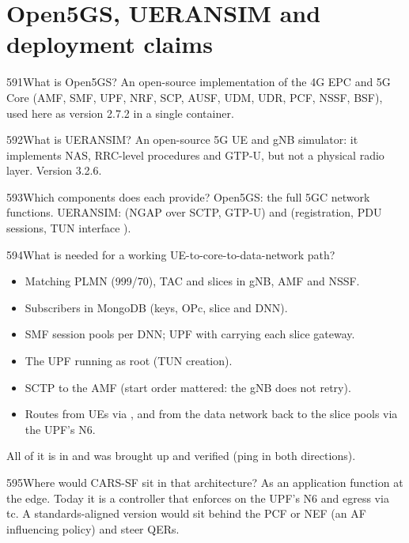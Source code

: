 \section{Open5GS, UERANSIM and deployment claims}

\begin{qa}{591}{What is Open5GS?}
An open-source implementation of the 4G EPC and 5G Core (AMF, SMF, UPF, NRF, SCP, AUSF, UDM, UDR, PCF, NSSF, BSF),
used here as version 2.7.2 in a single container.
\end{qa}

\begin{qa}{592}{What is UERANSIM?}
An open-source 5G UE and gNB simulator: it implements NAS, RRC-level procedures and GTP-U, but not a physical radio
layer. Version 3.2.6.
\end{qa}

\begin{qa}{593}{Which components does each provide?}
Open5GS: the full 5GC network functions. UERANSIM:  (NGAP over SCTP, GTP-U) and 
(registration, PDU sessions, TUN interface ).
\end{qa}

\begin{qa}{594}{What is needed for a working UE-to-core-to-data-network path?}
\begin{itemize}
\item Matching PLMN (999/70), TAC and slices in gNB, AMF and NSSF.
\item Subscribers in MongoDB (keys, OPc, slice and DNN).
\item SMF session pools per DNN; UPF with  carrying each slice gateway.
\item The UPF running as root (TUN creation).
\item SCTP to the AMF (start order mattered: the gNB does not retry).
\item Routes from UEs via , and from the data network back to the slice pools via the UPF's N6.
\end{itemize}
All of it is in  and was brought up and verified (ping in both directions).
\end{qa}

\begin{qa}{595}{Where would CARS-SF sit in that architecture?}
As an application function at the edge. Today it is a controller that enforces on the UPF's N6 and 
egress via tc. A standards-aligned version would sit behind the PCF or NEF (an AF influencing policy) and steer QERs.
\end{qa}

